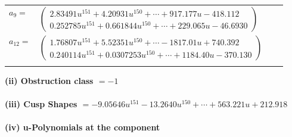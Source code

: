 \documentclass[1p]{elsarticle_modified}
\theoremstyle{definition}
\begin{document}
\begin{tabular}{m{7pt} m{180pt} m{7pt} m{180pt} }
\flushright $a_{9}=$&$\begin{pmatrix}2.83491 u^{151}+4.20931 u^{150}+\cdots+917.177 u-418.112\\0.252785 u^{151}+0.661844 u^{150}+\cdots+229.065 u-46.6930\end{pmatrix}$ \\
\flushright $a_{12}=$&$\begin{pmatrix}1.76807 u^{151}+5.52351 u^{150}+\cdots-1817.01 u+740.392\\0.240114 u^{151}+0.0307253 u^{150}+\cdots+1184.40 u-370.130\end{pmatrix}$\\&\end{tabular}
\flushleft \textbf{(ii) Obstruction class $= -1$}\\~\\
\flushleft \textbf{(iii) Cusp Shapes $= -9.05646 u^{151}-13.2640 u^{150}+\cdots+563.221 u+212.918$}\\~\\
\newpage\renewcommand{\arraystretch}{1}
\flushleft \textbf{(iv) u-Polynomials at the component}\newline \\
\end{document}
